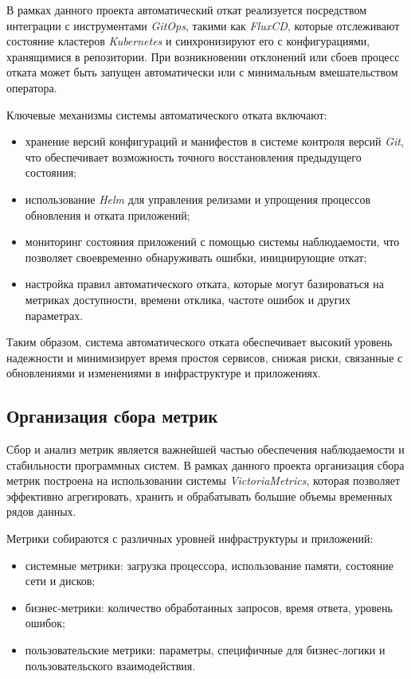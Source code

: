В рамках данного проекта автоматический откат реализуется посредством интеграции с инструментами \textit{GitOps}, такими как \textit{FluxCD}, которые отслеживают состояние кластеров \textit{Kubernetes} и синхронизируют его с конфигурациями, хранящимися в репозитории. При возникновении отклонений или сбоев процесс отката может быть запущен автоматически или с минимальным вмешательством оператора.

Ключевые механизмы системы автоматического отката включают:

\begin{itemize}
    \item хранение версий конфигураций и манифестов в системе контроля версий \textit{Git}, что обеспечивает возможность точного восстановления предыдущего состояния;
    \item использование \textit{Helm} для управления релизами и упрощения процессов обновления и отката приложений;
    \item мониторинг состояния приложений с помощью системы наблюдаемости, что позволяет своевременно обнаруживать ошибки, инициирующие откат;
    \item настройка правил автоматического отката, которые могут базироваться на метриках доступности, времени отклика, частоте ошибок и других параметрах.
\end{itemize}

Таким образом, система автоматического отката обеспечивает высокий уровень надежности и минимизирует время простоя сервисов, снижая риски, связанные с обновлениями и изменениями в инфраструктуре и приложениях.



\subsection{Организация сбора метрик}

Сбор и анализ метрик является важнейшей частью обеспечения наблюдаемости и стабильности программных систем. В рамках данного проекта организация сбора метрик построена на использовании системы \textit{VictoriaMetrics}, которая позволяет эффективно агрегировать, хранить и обрабатывать большие объемы временных рядов данных.

Метрики собираются с различных уровней инфраструктуры и приложений:

\begin{itemize}
    \item системные метрики: загрузка процессора, использование памяти, состояние сети и дисков;
    \item бизнес-метрики: количество обработанных запросов, время ответа, уровень ошибок;
    \item пользовательские метрики: параметры, специфичные для бизнес-логики и пользовательского взаимодействия.
\end{itemize}

